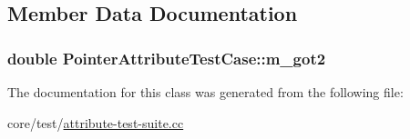 \subsection{Member Data Documentation}
\subsubsection[{\texorpdfstring{m\+\_\+got2}{m_got2}}]{\setlength{\rightskip}{0pt plus 5cm}double Pointer\+Attribute\+Test\+Case\+::m\+\_\+got2\hspace{0.3cm}{\ttfamily [private]}}\hypertarget{classPointerAttributeTestCase_a2df5aaa8612f351f656e04f2999c2f1a}{}\label{classPointerAttributeTestCase_a2df5aaa8612f351f656e04f2999c2f1a}


The documentation for this class was generated from the following file\+:\begin{DoxyCompactItemize}
\item 
core/test/\hyperlink{attribute-test-suite_8cc}{attribute-\/test-\/suite.\+cc}\end{DoxyCompactItemize}
